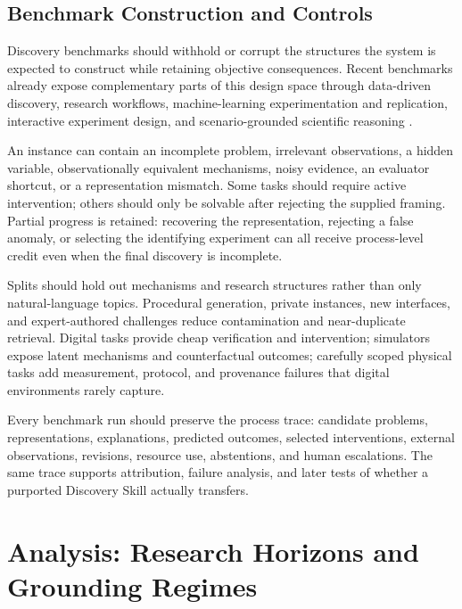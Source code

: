 \documentclass[11pt, a4paper, copyright]{google}
\begin{document}
\subsection{Benchmark Construction and Controls}
\label{subsec:discovery-benchmarks}

Discovery benchmarks should withhold or corrupt the structures the system is expected to construct while retaining objective consequences. Recent benchmarks already expose complementary parts of this design space through data-driven discovery, research workflows, machine-learning experimentation and replication, interactive experiment design, and scenario-grounded scientific reasoning \citep{gandhi2025boxinggym,majumder2025discoverybench,chen2025scienceagentbench,huang2024mlagentbench,chan2025mlebench,starace2025paperbench,song2025sde}.

An instance can contain an incomplete problem, irrelevant observations, a hidden variable, observationally equivalent mechanisms, noisy evidence, an evaluator shortcut, or a representation mismatch. Some tasks should require active intervention; others should only be solvable after rejecting the supplied framing. Partial progress is retained: recovering the representation, rejecting a false anomaly, or selecting the identifying experiment can all receive process-level credit even when the final discovery is incomplete.

Splits should hold out mechanisms and research structures rather than only natural-language topics. Procedural generation, private instances, new interfaces, and expert-authored challenges reduce contamination and near-duplicate retrieval. Digital tasks provide cheap verification and intervention; simulators expose latent mechanisms and counterfactual outcomes; carefully scoped physical tasks add measurement, protocol, and provenance failures that digital environments rarely capture.

Every benchmark run should preserve the process trace: candidate problems, representations, explanations, predicted outcomes, selected interventions, external observations, revisions, resource use, abstentions, and human escalations. The same trace supports attribution, failure analysis, and later tests of whether a purported Discovery Skill actually transfers.

\section{Analysis: Research Horizons and Grounding Regimes}
\label{sec:research-horizons}
\end{document}
